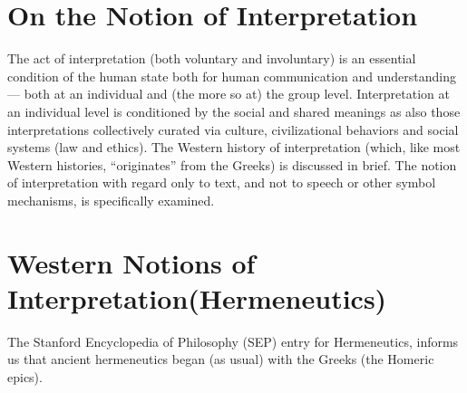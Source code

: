 \section*{On the Notion of Interpretation}

The act of interpretation (both voluntary and involuntary) is an essential condition of the human state both for human communication and understanding — both at an individual and (the more so at) the group level. Interpretation at an individual level is conditioned by the social and shared meanings as also those interpretations collectively curated via culture, civilizational behaviors and social systems (law and ethics). The Western history of interpretation (which, like most Western histories, “originates” from the Greeks) is discussed in brief. The notion of interpretation with regard only to text, and not to speech or other symbol mechanisms, is specifically examined.


\section*{Western Notions of Interpretation\hfil \break (Hermeneutics)}

The Stanford Encyclopedia of Philosophy (SEP) entry for Herme\-neutics, informs us that ancient hermeneutics began (as usual) with the Greeks (the Homeric epics).

